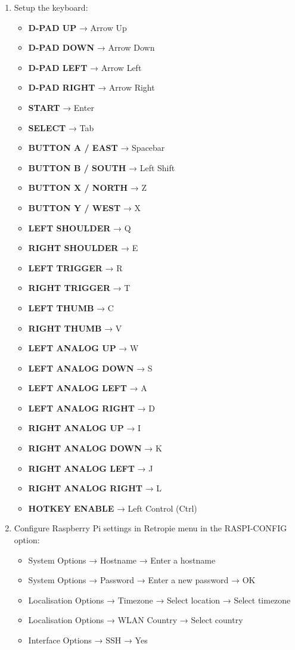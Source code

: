 \begin{enumerate}
\item Setup the keyboard:  
\begin{itemize}
    \item \textbf{D-PAD UP} → Arrow Up  
    \item \textbf{D-PAD DOWN} → Arrow Down  
    \item \textbf{D-PAD LEFT} → Arrow Left  
    \item \textbf{D-PAD RIGHT} → Arrow Right  
    \item \textbf{START} → Enter  
    \item \textbf{SELECT} → Tab  
    \item \textbf{BUTTON A / EAST} → Spacebar  
    \item \textbf{BUTTON B / SOUTH} → Left Shift  
    \item \textbf{BUTTON X / NORTH} → Z  
    \item \textbf{BUTTON Y / WEST} → X  
    \item \textbf{LEFT SHOULDER} → Q  
    \item \textbf{RIGHT SHOULDER} → E  
    \item \textbf{LEFT TRIGGER} → R  
    \item \textbf{RIGHT TRIGGER} → T  
    \item \textbf{LEFT THUMB} → C  
    \item \textbf{RIGHT THUMB} → V  
    \item \textbf{LEFT ANALOG UP} → W  
    \item \textbf{LEFT ANALOG DOWN} → S  
    \item \textbf{LEFT ANALOG LEFT} → A  
    \item \textbf{LEFT ANALOG RIGHT} → D  
    \item \textbf{RIGHT ANALOG UP} → I  
    \item \textbf{RIGHT ANALOG DOWN} → K  
    \item \textbf{RIGHT ANALOG LEFT} → J  
    \item \textbf{RIGHT ANALOG RIGHT} → L  
    \item \textbf{HOTKEY ENABLE} → Left Control (Ctrl)  
\end{itemize}

\item Configure Raspberry Pi settings in Retropie menu in the RASPI-CONFIG option:
\begin{itemize}
\item System Options → Hostname → Enter a hostname
\item System Options → Password → Enter a new password → OK
\item Localisation Options → Timezone → Select location → Select timezone
\item Localisation Options → WLAN Country → Select country
\item Interface Options → SSH → Yes
\end{itemize}


\end{enumerate}
